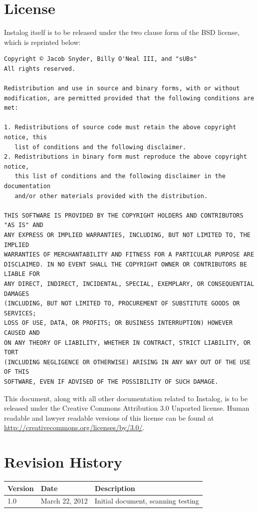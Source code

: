 \documentclass[letterpaper,12pt]{article}
\begin{document}
\newpage


\appendix
\section{License} \label{license}
Instalog itself is to be released under the two clause form of the BSD license,
which is reprinted below:

\begin{verbatim}
Copyright © Jacob Snyder, Billy O'Neal III, and "sUBs"
All rights reserved.

Redistribution and use in source and binary forms, with or without
modification, are permitted provided that the following conditions are met: 

1. Redistributions of source code must retain the above copyright notice, this
   list of conditions and the following disclaimer. 
2. Redistributions in binary form must reproduce the above copyright notice,
   this list of conditions and the following disclaimer in the documentation
   and/or other materials provided with the distribution. 

THIS SOFTWARE IS PROVIDED BY THE COPYRIGHT HOLDERS AND CONTRIBUTORS "AS IS" AND
ANY EXPRESS OR IMPLIED WARRANTIES, INCLUDING, BUT NOT LIMITED TO, THE IMPLIED
WARRANTIES OF MERCHANTABILITY AND FITNESS FOR A PARTICULAR PURPOSE ARE
DISCLAIMED. IN NO EVENT SHALL THE COPYRIGHT OWNER OR CONTRIBUTORS BE LIABLE FOR
ANY DIRECT, INDIRECT, INCIDENTAL, SPECIAL, EXEMPLARY, OR CONSEQUENTIAL DAMAGES
(INCLUDING, BUT NOT LIMITED TO, PROCUREMENT OF SUBSTITUTE GOODS OR SERVICES;
LOSS OF USE, DATA, OR PROFITS; OR BUSINESS INTERRUPTION) HOWEVER CAUSED AND
ON ANY THEORY OF LIABILITY, WHETHER IN CONTRACT, STRICT LIABILITY, OR TORT
(INCLUDING NEGLIGENCE OR OTHERWISE) ARISING IN ANY WAY OUT OF THE USE OF THIS
SOFTWARE, EVEN IF ADVISED OF THE POSSIBILITY OF SUCH DAMAGE.
\end{verbatim}

This document, along with all other documentation related to Instalog,  is to be
released under the Creative Commons Attribution 3.0 Unported license. Human
readable and lawyer readable versions of this license can be found at
\url{http://creativecommons.org/licenses/by/3.0/}.

\newpage

\section{Revision History} \label{revision_history}
\begin{tabular}{| l | l | l |}
\hline
\textbf{Version} & \textbf{Date} & \textbf{Description} \\
\hline
1.0 & March 22, 2012 & Initial document, scanning testing \\
\hline
\end{tabular}
\end{document}
